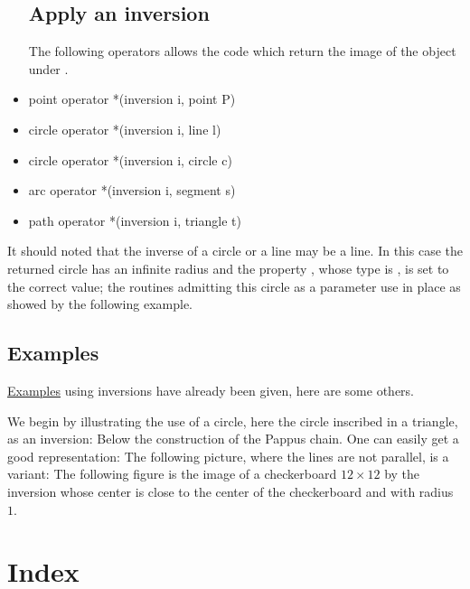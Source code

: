 \documentclass[pdftex]{article}
\begin{document}
\begin{itemize}
  \subsection{Apply an inversion}
  The following operators allows the code
   which return the image of
  the object  under .
\item {}
  \begin{Vcolor}
    point operator *(inversion i, point P)
  \end{Vcolor}
\item {}
  \begin{Vcolor}
    circle operator *(inversion i, line l)
  \end{Vcolor}
\item {}
  \begin{Vcolor}
    circle operator *(inversion i, circle c)
  \end{Vcolor}
\item {}
  \begin{Vcolor}
    arc operator *(inversion i, segment s)
  \end{Vcolor}
\item {}
  \begin{Vcolor}
    path operator *(inversion i, triangle t)
  \end{Vcolor}
\end{itemize}

It should noted that the inverse of a circle or a line may be a line.
In this case the returned circle  has an infinite radius and
the property , whose type is , is set to the correct value;
the routines admitting this circle as a parameter use  in
place as showed by the following example.

\subsection{Examples}
\href{#exemple_inversion}{Examples} using inversions have already been given, here are some others.

We begin by illustrating the use of a circle, here the circle inscribed in a
triangle, as an inversion:
Below the construction of the {\sc Pappus} chain.
One can easily get a good representation:
The following picture, where the lines are not parallel, is a variant:
{}
\hypertarget{inversion_damier}{The following figure} is the image of a
checkerboard $12\times{}12$ by the inversion whose center is close to
the center of the checkerboard and with radius $1$.
{}

\newpage
\section{Index}
\printindex
\end{document}
